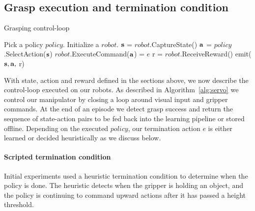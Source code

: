 \documentclass{article}
\begin{document}
\subsection{Grasp execution and termination condition}\label{appendix:termination}\begin{algorithm}[h]{\small
	\caption{Grasping control-loop}
	
	\label{alg:servo}
	\begin{algorithmic}[1]
	\STATE Pick a policy \(policy\).
	\STATE Initialize a \(robot\).
    \STATE $\mathbf{s}$ = \(robot\).CaptureState()
    \STATE $\mathbf{a}$ = \(policy\).SelectAction($\mathbf{s}$)
    \STATE \(robot\).ExecuteCommand($\mathbf{a}$)
     = $e$ 
    \STATE r = \(robot\).ReceiveReward()
    \STATE emit($\mathbf{s}, \mathbf{a},$ r)
   \ENDWHILE
 	\end{algorithmic}
}
\end{algorithm}
With state, action and reward defined in the sections above, we now describe the control-loop executed on our robots. As described in Algorithm~\ref{alg:servo} we control our manipulator by closing a loop around visual input and gripper commands. At the end of an episode we detect grasp success and return the sequence of state-action pairs to be fed back into the learning pipeline or stored offline. Depending on the executed \(policy\), our termination action $e$ is either learned or decided heuristically as we discuss below.
\paragraph{Scripted termination condition} Initial experiments used a heuristic termination condition to determine when the policy is done. The heuristic detects when the gripper is holding an object, and the policy is continuing to command upward actions after it has passed a height threshold.
\end{document}
